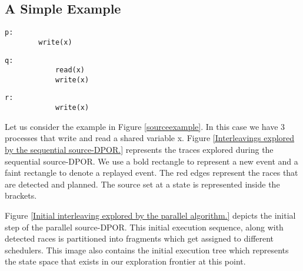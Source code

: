 \subsection{A Simple Example}


\begin{figure*}
    \begin{minipage}{0.3\textwidth}
      \begin{lstlisting}[frame=none, numbers=none]
        p:
        write(x)
      \end{lstlisting}
    \end{minipage}
    \begin{minipage}{0.3\textwidth}
        \begin{lstlisting}[frame=none, numbers=none]
            q:
            read(x)
            write(x)
        \end{lstlisting}
      \end{minipage}
      \begin{minipage}{0.3\textwidth}
        \begin{lstlisting}[frame=none, numbers=none]
            r:
            write(x)
        \end{lstlisting}
      \end{minipage}
      \caption{Simple readers-writes example}
      \label{sourceexample}
  \end{figure*}

Let us consider the example in Figure \ref{sourceexample}. In this case we have 3 processes that write and read a shared variable x.
Figure \ref{Interleavings explored by the sequential source-DPOR.} represents the traces explored during the sequential source-DPOR.
We use a bold rectangle to represent a new event and a faint rectangle to denote a replayed event. The red edges represent
the races that are detected and planned. The source set at a state is represented inside the brackets.



Figure \ref{Initial interleaving explored by the parallel algorithm.} depicts the initial step of the parallel source-DPOR. 
This initial execution sequence, along with detected races is partitioned into fragments which get assigned to different schedulers.
This image also contains the initial execution tree which represents the state space that exists in our exploration frontier
at this point.

